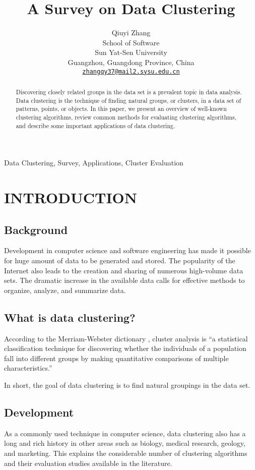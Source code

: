 \documentclass[conference]{IEEEtran}
\title{\LARGE \bf A Survey on Data Clustering}
\author{
Qiuyi Zhang \\
School of Software \\
Sun Yat-Sen University \\
Guangzhou, Guangdong Province, China \\
{\tt \href{mailto:zhangqy37@mail2.sysu.edu.cn}{zhangqy37@mail2.sysu.edu.cn}}
}
\begin{document}
\maketitle
\begin{abstract}
Discovering closely related groups in the data set is a prevalent topic in data analysis. Data clustering is the technique of finding natural groups, or clusters, in a data set of patterns, points, or objects. In this paper, we present an overview of well-known clustering algorithms, review common methods for evaluating clustering algorithms, and describe some important applications of data clustering.
\end{abstract}

\begin{IEEEkeywords}
Data Clustering, Survey, Applications, Cluster Evaluation
\end{IEEEkeywords}
\section{INTRODUCTION}\label{sec:Introduction}
\subsection{Background}
Development in computer science and software engineering has made it possible for huge amount of data to be generated and stored. The popularity of the Internet also leads to the creation and sharing of numerous high-volume data sets. The dramatic increase in the available data calls for effective methods to organize, analyze, and summarize data. 

\subsection{What is data clustering?}
According to the Merriam-Webster dictionary \cite{webster2006merriam}, cluster analysis is ``a statistical classification technique for discovering whether the individuals of a population fall into different groups by making quantitative comparisons of multiple characteristics.''

In short, the goal of data clustering is to find natural groupings in the data set. 

\subsection{Development}
As a commonly used technique in computer science, data clustering also has a long and rich history in other areas such as biology, medical research, geology, and marketing. This explains the considerable number of clustering algorithms and their evaluation studies available in the literature.
\end{document}
